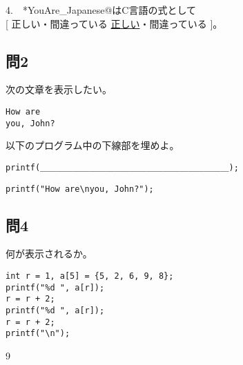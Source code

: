 \documentclass[a4j]{jarticle}
\def\ans#1#2{
\ifnum \anss=1
#1
\else
#2
\fi
}
\begin{document}
\begin{multicols*}{2}
4.　*YouAre_Japanese@はC言語の式として\\
\hfill[\ans{正しい・間違っている}{\underline{正しい}・間違っている}]。




\subsection*{問2}

次の文章を表示したい。
\begin{verbatim}
How are
you, John?
\end{verbatim}

以下のプログラム中の下線部を埋めよ。

\ifnum {}
\begin{verbatim}
printf(＿＿＿＿＿＿＿＿＿＿＿＿＿＿＿＿＿＿＿＿＿＿＿);
\end{verbatim}
\else
\begin{verbatim}
printf("How are\nyou, John?");
\end{verbatim}
\fi









\subsection*{問4}

何が表示されるか。
\begin{verbatim}
int r = 1, a[5] = {5, 2, 6, 9, 8};
printf("%d ", a[r]);
r = r + 2;
printf("%d ", a[r]);
r = r + 2;
printf("\n");
\end{verbatim}

\ans{\mbox{}}{{ 9}}


%
%
%
%




\end{multicols*}
\end{document}
